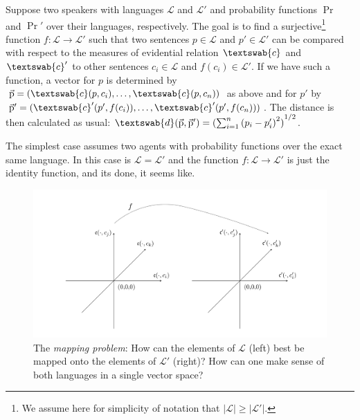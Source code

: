 \documentclass[11pt, a4paper]{scrartcl}
\renewcommand{\i}[1]{\emph{#1}}
\renewcommand{\L}{\mathcal{L}}
\renewcommand{\v}[1]{\vec{\mathrm{#1}}}
\newcommand{\m}[1]{\textswab{#1}}
\begin{document}
Suppose two speakers with languages $\L$ and $\L'$ and probability functions $\Pr$ and $\Pr'$ over their languages, respectively. The goal is to find a surjective\footnote{We assume here for simplicity of notation that $|\L| \geqslant |\L'|$.} function ${f: \L \rightarrow \L'}$ such that two sentences $p \in \L$ and $p' \in \L'$ can be compared with respect to the measures of evidential relation $\m{c}$ and $\m{c}'$ to other sentences $c_i \in \L$ and $f(c_i) \in \L'$. If we have such a function, a vector for $p$ is determined by $\v{p} = (\m{c}(p,c_i),\ldots,\m{c}(p,c_n))$ as above and for $p'$ by $\v{p}' = (\m{c}'(p',f(c_i)),\ldots,\m{c}'(p',f(c_n)))$. The distance is then calculated as usual: $\m{d}(\v{p},\v{p}')= {( \sum_{i=1}^n {(p_i-p_i')}^2 )}^{1/2}$.  

The simplest case assumes two agents with probability functions over the exact same language. In this case is $\L = \L'$ and the function $f: \L \rightarrow \L'$ is just the identity function, and its done, it seems like.

\begin{figure}
	\centering
    \includegraphics[width=\textwidth]{Mapping.png}
    \caption{The \i{mapping problem}: How can the elements of $\L$ (left) best be mapped onto the elements of $\L'$ (right)? How can one make sense of both languages in a single vector space?\label{fig:mapping}}
\end{figure}
\end{document}
